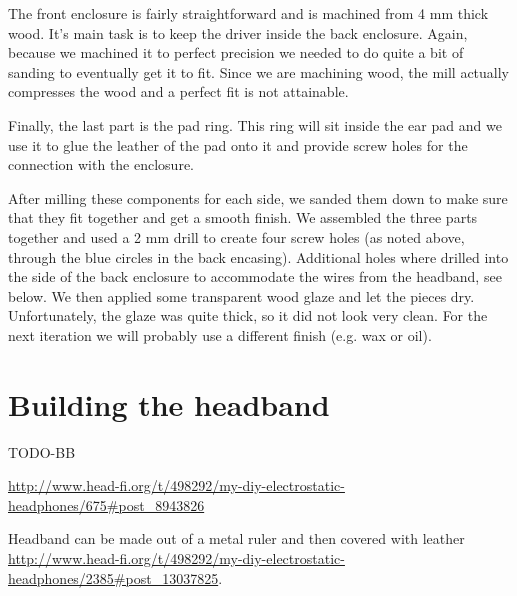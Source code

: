 \documentclass{article}
\begin{document}
The front enclosure is fairly straightforward and is machined from 4 mm thick wood. It's main task is to keep the driver inside the back enclosure. Again, because we machined it to perfect precision we needed to do quite a bit of sanding to eventually get it to fit. Since we are machining wood, the mill actually compresses the wood and a perfect fit is not attainable.

Finally, the last part is the pad ring. This ring will sit inside the ear pad and we use it to glue the leather of the pad onto it and provide screw holes for the connection with the enclosure.

After milling these components for each side, we sanded them down to make sure that they fit together and get a smooth finish. We assembled the three parts together and used a 2 mm drill to create four screw holes (as noted above, through the blue circles in the back encasing). Additional holes where drilled into the side of the back enclosure to accommodate the wires from the headband, see below. We then applied some transparent wood glaze and let the pieces dry. Unfortunately, the glaze was quite thick, so it did not look very clean. For the next iteration we will probably use a different finish (e.g. wax or oil).


\section{Building the headband}
\label{s:headband}
TODO-BB

\url{http://www.head-fi.org/t/498292/my-diy-electrostatic-headphones/675#post_8943826}

Headband can be made out of a metal ruler and then covered with leather \url{http://www.head-fi.org/t/498292/my-diy-electrostatic-headphones/2385#post_13037825}.
\end{document}
